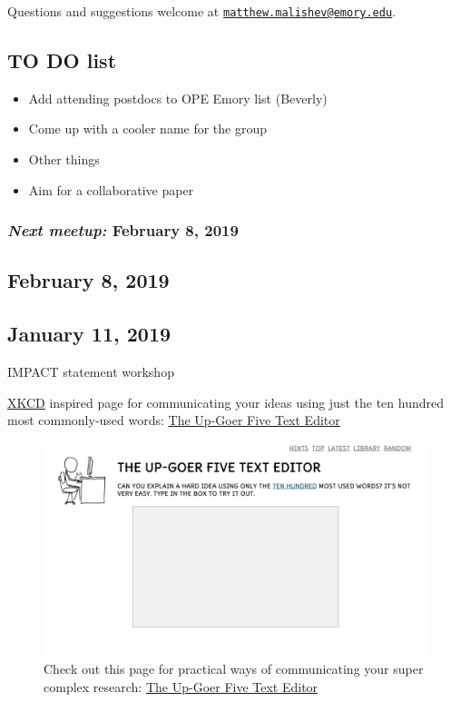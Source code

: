 \documentclass[10,portrait]{article}
\providecommand{\tightlist}{%
  \setlength{\itemsep}{0pt}\setlength{\parskip}{0pt}}
\begin{document}
Questions and suggestions welcome at
\href{mailto:matthew.malishev@emory.edu}{\nolinkurl{matthew.malishev@emory.edu}}.

\newpage  

\subsection{TO DO list}\label{to-do-list}

\begin{itemize}
\tightlist
\item
  Add attending postdocs to OPE Emory list (Beverly)\\
\item
  Come up with a cooler name for the group\\
\item
  Other things\\
\item
  Aim for a collaborative paper
\end{itemize}

\subsubsection{\texorpdfstring{\emph{Next meetup:} February 8,
2019}{Next meetup: February 8, 2019}}\label{next-meetup-february-8-2019}

\newpage  

\subsection{February 8, 2019}\label{february-8-2019}

\newpage  

\subsection{January 11, 2019}\label{january-11-2019}

IMPACT statement workshop

\href{https://xkcd.com/}{XKCD} inspired page for communicating your
ideas using just the ten hundred most commonly-used words:
\href{http://splasho.com/upgoer5/}{The Up-Goer Five Text Editor}

\begin{figure}
\centering
\includegraphics{upgoer5.jpeg}
\caption{Check out this page for practical ways of communicating your
super complex research: \href{http://splasho.com/upgoer5/}{The Up-Goer
Five Text Editor}}
\end{figure}
\end{document}
